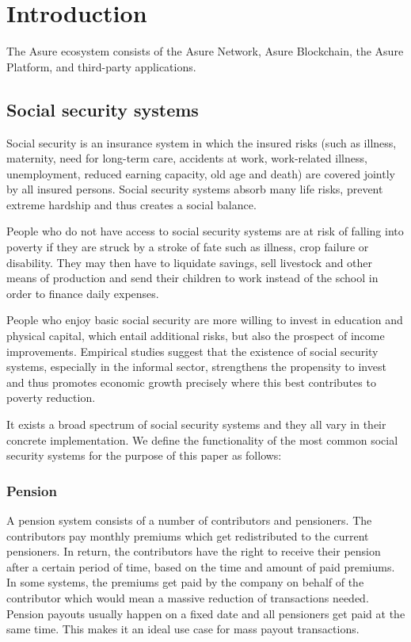 \section{Introduction}
The Asure ecosystem consists of the Asure Network, Asure Blockchain, the Asure Platform, and third-party applications. 

\subsection{Social security systems}
Social security is an insurance system in which the insured risks (such as illness, maternity, need for long-term care, accidents at work, work-related illness, unemployment, reduced earning capacity, old age and death) are covered jointly by all insured persons. Social security systems absorb many life risks, prevent extreme hardship and thus creates a social balance. 

People who do not have access to social security systems are at risk of falling into poverty if they are struck by a stroke of fate such as illness, crop failure or disability. They may then have to liquidate savings, sell livestock and other means of production and send their children to work instead of the school in order to finance daily expenses. \cite{erd}

People who enjoy basic social security are more willing to invest in education and physical capital, which entail additional risks, but also the prospect of income improvements. Empirical studies suggest that the existence of social security systems, especially in the informal sector, strengthens the propensity to invest and thus promotes economic growth precisely where this best contributes to poverty reduction. \cite{hcms}

It exists a broad spectrum of social security systems and they all vary in their concrete implementation. We define the functionality of the most common social security systems for the purpose of this paper as follows:

\subsubsection*{Pension}
A pension system consists of a number of contributors and pensioners. The contributors pay monthly premiums which get redistributed to the current pensioners. In return, the contributors have the right to receive their pension after a certain period of time, based on the time and amount of paid premiums. In some systems, the premiums get paid by the company on behalf of the contributor which would mean a massive reduction of transactions needed.
Pension payouts usually happen on a fixed date and all pensioners get paid at the same time. This makes it an ideal use case for mass payout transactions.

